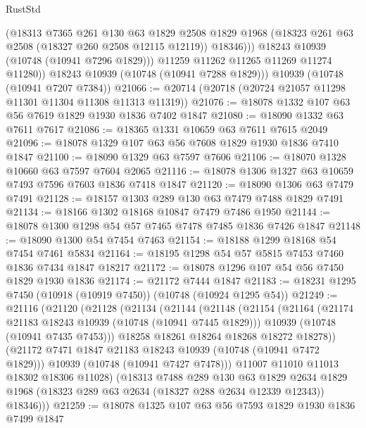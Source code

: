\begin{lexlean}{RustStd}
\begin{coremodule}
{\begin{coremodule}
{{{{{                (@18313
                  @7365
                  @261
                  @130
                  @63
                  @1829
                  @2508
                  @1829
                  @1968
                  (@18323 @261 @63 @2508 (@18327 @260 @2508 @12115 @12119))
                  @18346)))
            @18243
            @10939
            (@10748 (@10941 @7296 @1829)))
          @11259
          @11262
          @11265
          @11269
          @11274
          @11280))
      @18243
      @10939
      (@10748 (@10941 @7288 @1829)))
    @10939
    (@10748 (@10941 @7207 @7384))
@21066 := @20714 (@20718 (@20724 @21057 @11298 @11301 @11304 @11308 @11313 @11319))
@21076 := @18078 @1332 @107 @63 @56 @7619 @1829 @1930 @1836 @7402 @1847
@21080 := @18090 @1332 @63 @7611 @7617
@21086 := @18365 @1331 @10659 @63 @7611 @7615 @2049
@21096 := @18078 @1329 @107 @63 @56 @7608 @1829 @1930 @1836 @7410 @1847
@21100 := @18090 @1329 @63 @7597 @7606
@21106 := @18070 @1328 @10660 @63 @7597 @7604 @2065
@21116 := @18078 @1306 @1327 @63 @10659 @7493 @7596 @7603 @1836 @7418 @1847
@21120 := @18090 @1306 @63 @7479 @7491
@21128 := @18157 @1303 @289 @130 @63 @7479 @7488 @1829 @7491
@21134 := @18166 @1302 @18168 @10847 @7479 @7486 @1950
@21144 := @18078 @1300 @1298 @54 @57 @7465 @7478 @7485 @1836 @7426 @1847
@21148 := @18090 @1300 @54 @7454 @7463
@21154 := @18188 @1299 @18168 @54 @7454 @7461 @5834
@21164 := @18195 @1298 @54 @57 @5815 @7453 @7460 @1836 @7434 @1847 @18217
@21172 := @18078 @1296 @107 @54 @56 @7450 @1829 @1930 @1836
@21174 := @21172 @7444 @1847
@21183 := @18231 @1295 @7450 (@10918 (@10919 @7450)) (@10748 (@10924 @1295 @54))
@21249 := @21116
    (@21120
      (@21128
        (@21134
          (@21144
            (@21148
              (@21154
                (@21164
                  (@21174 @21183 @18243 @10939 (@10748 (@10941 @7445 @1829)))
                  @10939
                  (@10748 (@10941 @7435 @7453)))
                @18258
                @18261
                @18264
                @18268
                @18272
                @18278))
            (@21172 @7471 @1847 @21183 @18243 @10939 (@10748 (@10941 @7472 @1829)))
            @10939
            (@10748 (@10941 @7427 @7478)))
          @11007
          @11010
          @11013
          @18302
          @18306
          @11028)
        (@18313
          @7488
          @289
          @130
          @63
          @1829
          @2634
          @1829
          @1968
          (@18323 @289 @63 @2634 (@18327 @288 @2634 @12339 @12343))
          @18346)))
@21259 := @18078 @1325 @107 @63 @56 @7593 @1829 @1930 @1836 @7499 @1847
}}}}}
\end{coremodule}}
\end{coremodule}
\end{lexlean}
